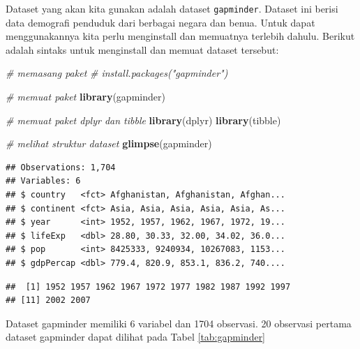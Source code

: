 \documentclass[]{book}
\newenvironment{Shaded}{\begin{snugshade}}{\end{snugshade}}
\newcommand{\KeywordTok}[1]{\textcolor[rgb]{0.13,0.29,0.53}{\textbf{#1}}}
\newcommand{\CommentTok}[1]{\textcolor[rgb]{0.56,0.35,0.01}{\textit{#1}}}
\newcommand{\OperatorTok}[1]{\textcolor[rgb]{0.81,0.36,0.00}{\textbf{#1}}}
\newcommand{\NormalTok}[1]{#1}
\begin{document}
Dataset yang akan kita gunakan adalah dataset \texttt{gapminder}.
Dataset ini berisi data demografi penduduk dari berbagai negara dan
benua. Untuk dapat menggunakannya kita perlu menginstall dan memuatnya
terlebih dahulu. Berikut adalah sintaks untuk menginstall dan memuat
dataset tersebut:

\begin{Shaded}
\begin{Highlighting}[]
\CommentTok{# memasang paket}
\CommentTok{# install.packages("gapminder")}

\CommentTok{# memuat paket}
\KeywordTok{library}\NormalTok{(gapminder)}

\CommentTok{# memuat paket dplyr dan tibble}
\KeywordTok{library}\NormalTok{(dplyr)}
\KeywordTok{library}\NormalTok{(tibble)}
\end{Highlighting}
\end{Shaded}

\begin{Shaded}
\begin{Highlighting}[]
\CommentTok{# melihat struktur dataset}
\KeywordTok{glimpse}\NormalTok{(gapminder)}
\end{Highlighting}
\end{Shaded}

\begin{verbatim}
## Observations: 1,704
## Variables: 6
## $ country   <fct> Afghanistan, Afghanistan, Afghan...
## $ continent <fct> Asia, Asia, Asia, Asia, Asia, As...
## $ year      <int> 1952, 1957, 1962, 1967, 1972, 19...
## $ lifeExp   <dbl> 28.80, 30.33, 32.00, 34.02, 36.0...
## $ pop       <int> 8425333, 9240934, 10267083, 1153...
## $ gdpPercap <dbl> 779.4, 820.9, 853.1, 836.2, 740....
\end{verbatim}

\begin{Shaded}
\end{Shaded}

\begin{verbatim}
##  [1] 1952 1957 1962 1967 1972 1977 1982 1987 1992 1997
## [11] 2002 2007
\end{verbatim}

Dataset gapminder memiliki 6 variabel dan 1704 observasi. 20 observasi
pertama dataset gapminder dapat dilihat pada Tabel \ref{tab:gapminder}
\end{document}
